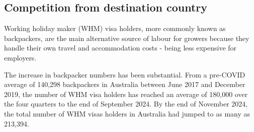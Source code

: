 \documentclass[9pt,a4paper,twocolumn,twoside]{tau-class/tau}
\begin{document}
 
 

 









\subsection{Competition from destination country}

Working holiday maker (WHM) visa holders, more commonly known as backpackers, are the main alternative source of labour for growers because they handle their own travel and accommodation costs - being less expensive for employers.






The increase in backpacker numbers has been substantial. From a pre-COVID average of 140,298 backpackers in Australia between June 2017 and December 2019, the number of WHM visa holders has reached an average of 180,000 over the four quarters to the end of September 2024. By the end of November 2024, the total number of WHM visas holders in Australia had jumped to as many as 213,394.    
\end{document}
